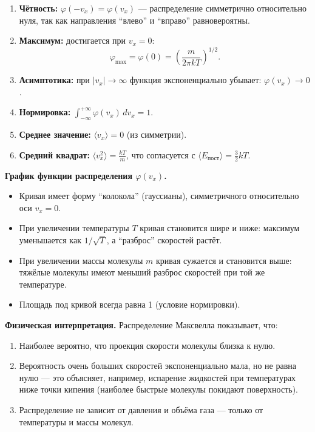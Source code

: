 \begin{property}
\begin{enumerate}
    \item \textbf{Чётность:} $\varphi(-v_x) = \varphi(v_x)$ --- распределение симметрично относительно нуля, так как направления ``влево'' и ``вправо'' равновероятны.
    \item \textbf{Максимум:} достигается при $v_x = 0$:
    \begin{equation}
        \varphi_{\max} = \varphi(0) = \left( \frac{m}{2\pi k T} \right)^{1/2}.
    \end{equation}
    \item \textbf{Асимптотика:} при $|v_x| \to \infty$ функция экспоненциально убывает: $\varphi(v_x) \to 0$.
    \item \textbf{Нормировка:} $\int_{-\infty}^{+\infty} \varphi(v_x) \, dv_x = 1$.
    \item \textbf{Среднее значение:} $\langle v_x \rangle = 0$ (из симметрии).
    \item \textbf{Средний квадрат:} $\langle v_x^2 \rangle = \frac{kT}{m}$, что согласуется с $\langle E_{\text{пост}} \rangle = \frac{3}{2} kT$.
\end{enumerate}
\end{property}

\begin{remark}
\textbf{График функции распределения $\varphi(v_x)$.}
\begin{itemize}
    \item Кривая имеет форму ``колокола'' (гауссианы), симметричного относительно оси $v_x = 0$.
    \item При увеличении температуры $T$ кривая становится шире и ниже: максимум уменьшается как $1/\sqrt{T}$, а ``разброс'' скоростей растёт.
    \item При увеличении массы молекулы $m$ кривая сужается и становится выше: тяжёлые молекулы имеют меньший разброс скоростей при той же температуре.
    \item Площадь под кривой всегда равна 1 (условие нормировки).
\end{itemize}
\end{remark}

\begin{remark}
\textbf{Физическая интерпретация.} Распределение Максвелла показывает, что:
\begin{enumerate}
    \item Наиболее вероятно, что проекция скорости молекулы близка к нулю.
    \item Вероятность очень больших скоростей экспоненциально мала, но не равна нулю --- это объясняет, например, испарение жидкостей при температурах ниже точки кипения (наиболее быстрые молекулы покидают поверхность).
    \item Распределение не зависит от давления и объёма газа --- только от температуры и массы молекул.
\end{enumerate}
\end{remark}

